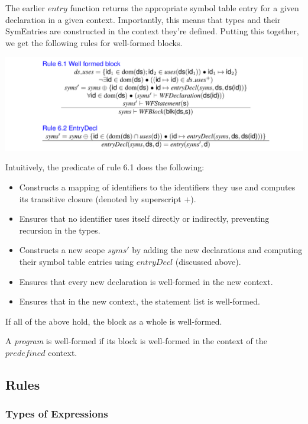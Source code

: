 \documentclass[10pt,a4paper,]{article}
\providecommand{\tightlist}{%
  \setlength{\itemsep}{0pt}\setlength{\parskip}{0pt}}
\begin{document}
The earlier \(\textit{entry}\) function returns the appropriate symbol
table entry for a given declaration in a given context. Importantly,
this means that types and their SymEntries are constructed in the
context they're defined. Putting this together, we get the following
rules for well-formed blocks.

\includegraphics{assets/image-20200703193012243.png}

Intuitively, the predicate of rule 6.1 does the following:

\begin{itemize}
\tightlist
\item
  Constructs a mapping of identifiers to the identifiers they use and
  computes its transitive closure (denoted by superscript \(+\)).
\item
  Ensures that no identifier uses itself directly or indirectly,
  preventing recursion in the types.
\item
  Constructs a new scope \(\textit{syms}'\) by adding the new
  declarations and computing their symbol table entries using
  \(\textit{entryDecl}\) (discussed above).
\item
  Ensures that every new declaration is well-formed in the new context.
\item
  Ensures that in the new context, the statement list is well-formed.
\end{itemize}

If all of the above hold, the block as a whole is well-formed.

A \emph{program} is well-formed if its block is well-formed in the
context of the \(\textit{predefined}\) context.

\hypertarget{rules}{%
\subsection{Rules}\label{rules}}

\hypertarget{types-of-expressions}{%
\subsubsection{Types of Expressions}\label{types-of-expressions}}
\end{document}
